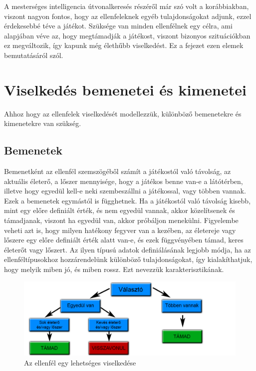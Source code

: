 \label{Chap:viselkedes}




A mesterséges intelligencia útvonalkeresés részéről már szó volt a korábbiakban, viszont nagyon fontos, hogy az ellenfeleknek egyéb tulajdonságokat adjunk, ezzel érdekesebbé téve a játékot. Szüksége van minden ellenfélnek egy célra, ami alapjában véve az, hogy megtámadják a játékost, viszont bizonyos szituációkban ez megváltozik, így kapunk még élethűbb viselkedést. Ez a fejezet ezen elemek bemutatásáról szól.

\section{Viselkedés bemenetei és kimenetei}

Ahhoz hogy az ellenfelek viselkedését modellezzük, különböző bemenetekre és kimenetekre van szükség.

\subsection{Bemenetek}
Bemenetként az ellenfél szemszögéből számít a játékostól való távolság, az aktuális életerő, a lőszer mennyisége, hogy a játékos benne van-e a látótérben, illetve hogy egyedül kell-e neki szembeszállni a játékossal, vagy többen vannak. Ezek a bemenetek egymástól is függhetnek. Ha a játékostól való távolság kisebb, mint egy előre definiált érték, és nem egyedül vannak, akkor közelítsenek és támadjanak, viszont ha egyedül van, akkor próbáljon menekülni. Figyelembe veheti azt is, hogy milyen hatékony fegyver van a kezében, az életereje vagy lőszere egy előre definiált érték alatt van-e, és ezek függvényében támad, keres életerőt vagy lőszert. Az ilyen típusú adatok definiálásának legjobb módja, ha az ellenféltípusokhoz hozzárendelünk különböző tulajdonságokat, így kialakíthatjuk, hogy melyik miben jó, és miben rossz. Ezt nevezzük karakterisztikának.

\begin{figure}[h]
\centering
\includegraphics[scale=0.38]{kepek/viselkedes.png}
\caption{Az ellenfél egy lehetséges viselkedése}
\label{fig:behavior}
\end{figure}

